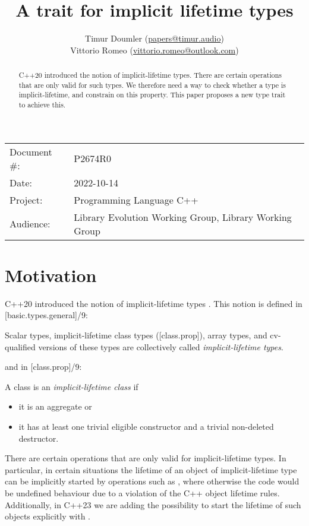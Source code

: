 


\title{A trait for implicit lifetime types}
\author{ Timur Doumler \small(\href{mailto:papers@timur.audio}{papers@timur.audio})  \\ Vittorio Romeo \small(\href{mailto:vittorio.romeo@outlook.com}{vittorio.romeo@outlook.com}) }
\date{}
\maketitle

\begin{tabular}{ll}
Document \#: & P2674R0 \\
Date: &2022-10-14 \\
Project: & Programming Language C++ \\
Audience: & Library Evolution Working Group, Library Working Group
\end{tabular}

\begin{abstract}
C++20 introduced the notion of implicit-lifetime types. There are certain operations that are only valid for such types. We therefore need a way to check whether a type is implicit-lifetime, and constrain on this property. This paper proposes a new type trait  to achieve this.
\end{abstract}

\section{Motivation}
\label{sec:motivation}

C++20 introduced the notion of implicit-lifetime types \cite{P0593R6}. This notion is defined in [basic.types.general]/9:

\begin{adjustwidth}{0.5cm}{0.5cm}
Scalar types, implicit-lifetime class types ([class.prop]), array types, and cv-qualified versions of these types are collectively called \emph{implicit-lifetime types}.
\end{adjustwidth}

and in [class.prop]/9:

\begin{adjustwidth}{0.5cm}{0.5cm}
A class  is an \emph{implicit-lifetime class} if 
\begin{itemize}
\item it is an aggregate or
\item it has at least one trivial eligible constructor and a trivial non-deleted destructor.
\end{itemize}
\end{adjustwidth}
There are certain operations that are only valid for implicit-lifetime types. In particular, in certain situations the lifetime of an object of implicit-lifetime type can be implicitly started by operations such as , where otherwise the code would be undefined behaviour due to a violation of the C++ object lifetime rules. Additionally, in C++23 we are adding the possibility to start the lifetime of such objects explicitly with  \cite{P2590R2}.

